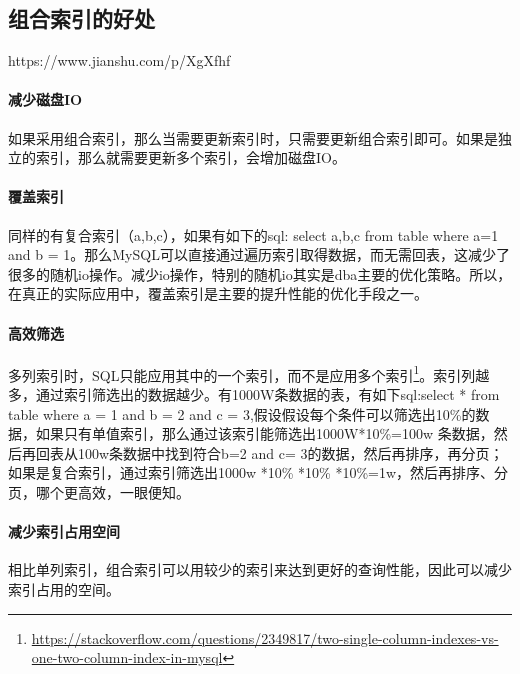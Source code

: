 \documentclass[../../../interview-questions.tex]{subfiles}
\begin{document}
\subsection{组合索引的好处}

https://www.jianshu.com/p/XgXfhf

\paragraph{减少磁盘IO}如果采用组合索引，那么当需要更新索引时，只需要更新组合索引即可。如果是独立的索引，那么就需要更新多个索引，会增加磁盘IO。

\paragraph{覆盖索引}同样的有复合索引（a,b,c），如果有如下的sql: select a,b,c from table where a=1 and b = 1。那么MySQL可以直接通过遍历索引取得数据，而无需回表，这减少了很多的随机io操作。减少io操作，特别的随机io其实是dba主要的优化策略。所以，在真正的实际应用中，覆盖索引是主要的提升性能的优化手段之一。

\paragraph{高效筛选}

多列索引时，SQL只能应用其中的一个索引，而不是应用多个索引\footnote{\url{https://stackoverflow.com/questions/2349817/two-single-column-indexes-vs-one-two-column-index-in-mysql}}。索引列越多，通过索引筛选出的数据越少。有1000W条数据的表，有如下sql:select * from table where a = 1 and b = 2 and c = 3,假设假设每个条件可以筛选出10\%的数据，如果只有单值索引，那么通过该索引能筛选出1000W*10\%=100w 条数据，然后再回表从100w条数据中找到符合b=2 and c= 3的数据，然后再排序，再分页；如果是复合索引，通过索引筛选出1000w *10\% *10\% *10\%=1w，然后再排序、分页，哪个更高效，一眼便知。

\paragraph{减少索引占用空间}

相比单列索引，组合索引可以用较少的索引来达到更好的查询性能，因此可以减少索引占用的空间。
\end{document}
